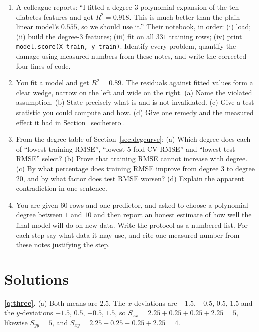 \documentclass[11pt]{article}
\begin{document}
\begin{enumerate}[leftmargin=*]
  \item\label{q:debug} A colleague reports: ``I fitted a degree-3 polynomial
    expansion of the ten diabetes features and got $R^2 = 0.918$. This is much
    better than the plain linear model's $0.555$, so we should use it.''
    Their notebook, in order: (i) load; (ii) build the degree-3 features;
    (iii) fit on all $331$ training rows; (iv) print
    \texttt{model.score(X\_train, y\_train)}. Identify every problem, quantify
    the damage using measured numbers from these notes, and write the
    corrected four lines of code.

  \item\label{q:resid} You fit a model and get $R^2 = 0.89$. The residuals
    against fitted values form a clear wedge, narrow on the left and wide on
    the right. (a) Name the violated assumption. (b) State precisely what is
    and is not invalidated. (c) Give a test statistic you could compute and
    how. (d) Give one remedy and the measured effect it had in
    Section~\ref{sec:hetero}.

  \item\label{q:overfit} From the degree table of Section~\ref{sec:degcurve}:
    (a) Which degree does each of ``lowest training RMSE'', ``lowest 5-fold CV
    RMSE'' and ``lowest test RMSE'' select? (b) Prove that training RMSE cannot
    increase with degree. (c) By what percentage does training RMSE improve
    from degree $3$ to degree $20$, and by what factor does test RMSE worsen?
    (d) Explain the apparent contradiction in one sentence.

  \item\label{q:design} You are given $60$ rows and one predictor, and asked
    to choose a polynomial degree between $1$ and $10$ and then report an
    honest estimate of how well the final model will do on new data. Write the
    protocol as a numbered list. For each step say what data it may use, and
    cite one measured number from these notes justifying the step.
\end{enumerate}

\section{Solutions}
\label{sec:solutions}

\textbf{\ref{q:three}.} (a) Both means are $2.5$. The $x$-deviations are
$-1.5$, $-0.5$, $0.5$, $1.5$ and the $y$-deviations $-1.5$, $0.5$, $-0.5$,
$1.5$, so
$S_{xx} = 2.25 + 0.25 + 0.25 + 2.25 = 5$, likewise $S_{yy} = 5$, and
$S_{xy} = 2.25 - 0.25 - 0.25 + 2.25 = 4$.
\end{document}
